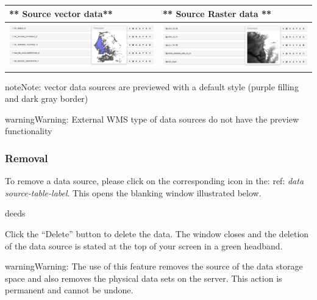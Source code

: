 \documentclass[letterpaper,10pt,english]{sphinxmanual}
\begin{document}
\begin{tabulary}{\linewidth}{|L|L|}
\hline

** Source vector data**
 & 
** Source Raster data **
\\
\hline
\includegraphics[width=1.000\linewidth]{preview-vector-window.png}
 & 
\includegraphics[width=1.000\linewidth]{preview-raster-window.png}
\\
\hline\end{tabulary}


\begin{notice}{note}{Note:}
vector data sources are previewed with a default style (purple filling and dark gray border)
\end{notice}

\begin{notice}{warning}{Warning:}
External WMS type of data sources do not have the preview functionality
\end{notice}


\subsubsection{Removal}
\label{data/datasources:suppression}
To remove a data source, please click on the corresponding icon in the: ref: \emph{data source-table-label}. This opens the blanking window illustrated below.

deeds

Click the ``Delete'' button to delete the data. The window closes and the deletion of the data source is stated at the top of your screen in a green headband.

\begin{notice}{warning}{Warning:}
The use of this feature removes the source of the data storage space and also removes the physical data sets on the server. This action is permanent and cannot be undone.
\end{notice}
\end{document}
